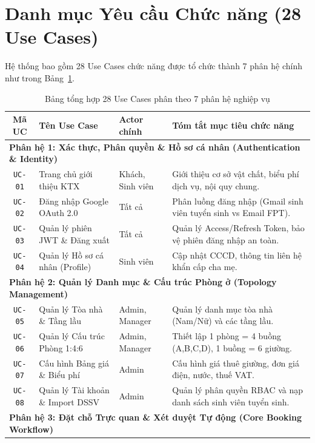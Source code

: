 \section{Danh mục Yêu cầu Chức năng (28 Use Cases)}
Hệ thống bao gồm 28 Use Cases chức năng được tổ chức thành 7 phân hệ chính như trong Bảng~\ref{tab:usecases_summary}.

\begin{table}[htbp]
\centering
\caption{Bảng tổng hợp 28 Use Cases phân theo 7 phân hệ nghiệp vụ}
\label{tab:usecases_summary}
\footnotesize
\begin{tabularx}{\textwidth}{|c|l|l|X|}
\hline
\rowcolor{blue!10}
\textbf{Mã UC} & \textbf{Tên Use Case} & \textbf{Actor chính} & \textbf{Tóm tắt mục tiêu chức năng} \\ \hline
\multicolumn{4}{|l|}{\textbf{Phân hệ 1: Xác thực, Phân quyền \& Hồ sơ cá nhân (Authentication \& Identity)}} \\ \hline
\texttt{UC-01} & Trang chủ giới thiệu KTX & Khách, Sinh viên & Giới thiệu cơ sở vật chất, biểu phí dịch vụ, nội quy chung. \\ \hline
\texttt{UC-02} & Đăng nhập Google OAuth 2.0 & Tất cả & Phân luồng đăng nhập (Gmail sinh viên tuyển sinh vs Email FPT). \\ \hline
\texttt{UC-03} & Quản lý phiên JWT \& Đăng xuất & Tất cả & Quản lý Access/Refresh Token, bảo vệ phiên đăng nhập an toàn. \\ \hline
\texttt{UC-04} & Quản lý Hồ sơ cá nhân (Profile) & Sinh viên & Cập nhật CCCD, thông tin liên hệ khẩn cấp cha mẹ. \\ \hline
\multicolumn{4}{|l|}{\textbf{Phân hệ 2: Quản lý Danh mục \& Cấu trúc Phòng ở (Topology Management)}} \\ \hline
\texttt{UC-05} & Quản lý Tòa nhà \& Tầng lầu & Admin, Manager & Quản lý danh mục tòa nhà (Nam/Nữ) và các tầng lầu. \\ \hline
\texttt{UC-06} & Quản lý Cấu trúc Phòng 1:4:6 & Admin, Manager & Thiết lập 1 phòng = 4 buồng (A,B,C,D), 1 buồng = 6 giường. \\ \hline
\texttt{UC-07} & Cấu hình Bảng giá \& Biểu phí & Admin & Cấu hình giá thuê giường, đơn giá điện, nước, thuế VAT. \\ \hline
\texttt{UC-08} & Quản lý Tài khoản \& Import DSSV & Admin & Quản lý phân quyền RBAC và nạp danh sách sinh viên tuyển sinh. \\ \hline
\multicolumn{4}{|l|}{\textbf{Phân hệ 3: Đặt chỗ Trực quan \& Xét duyệt Tự động (Core Booking Workflow)}} \\ \hline

\end{tabularx}
\end{table}
